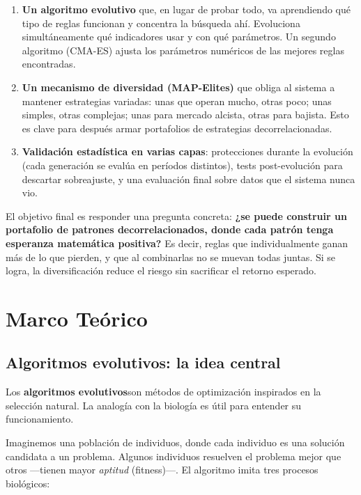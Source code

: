 \documentclass[12pt,a4paper]{article}
\begin{document}
\begin{enumerate}
\item \textbf{Un algoritmo evolutivo} que, en lugar de probar todo, va aprendiendo
qué tipo de reglas funcionan y concentra la búsqueda ahí. Evoluciona
simultáneamente qué indicadores usar y con qué parámetros. Un segundo algoritmo
(CMA-ES) ajusta los parámetros numéricos de las mejores reglas encontradas.

\item \textbf{Un mecanismo de diversidad (MAP-Elites)} que obliga al sistema a
mantener estrategias variadas: unas que operan mucho, otras poco; unas simples,
otras complejas; unas para mercado alcista, otras para bajista. Esto es clave para
después armar portafolios de estrategias decorrelacionadas.

\item \textbf{Validación estadística en varias capas}: protecciones durante la
evolución (cada generación se evalúa en períodos distintos), tests post-evolución
para descartar sobreajuste, y una evaluación final sobre datos que el sistema nunca
vio.
\end{enumerate}

El objetivo final es responder una pregunta concreta: \textbf{¿se puede construir un
portafolio de patrones decorrelacionados, donde cada patrón tenga esperanza matemática
positiva?} Es decir, reglas que individualmente ganan más de lo que pierden, y que al
combinarlas no se muevan todas juntas. Si se logra, la diversificación reduce el riesgo
sin sacrificar el retorno esperado.

\section{Marco Teórico}
\label{sec:marco}

\subsection{Algoritmos evolutivos: la idea central}

Los \textbf{algoritmos evolutivos}son métodos de optimización inspirados en la selección natural. La analogía con la
biología es útil para entender su funcionamiento.

Imaginemos una población de individuos, donde cada individuo es una solución candidata
a un problema. Algunos individuos resuelven el problema mejor que otros ---tienen mayor
\textit{aptitud} (fitness)---. El algoritmo imita tres procesos biológicos:
\end{document}

